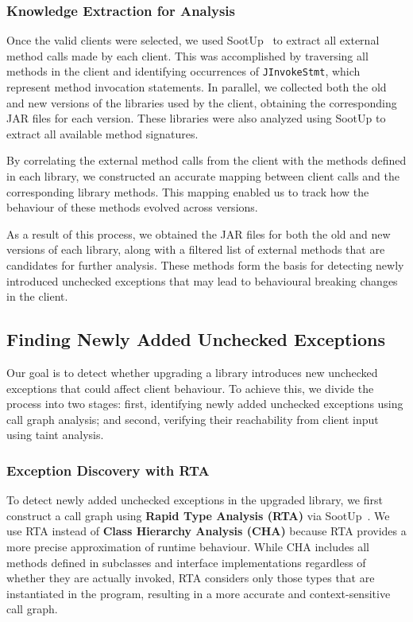 \subsubsection{Knowledge Extraction for Analysis}

Once the valid clients were selected, we used SootUp~\cite{Karakaya24:_sootup} to extract all external method calls made by each client. This was accomplished by traversing all methods in the client and identifying occurrences of \texttt{JInvokeStmt}, which represent method invocation statements. In parallel, we collected both the old and new versions of the libraries used by the client, obtaining the corresponding JAR files for each version. These libraries were also analyzed using SootUp to extract all available method signatures.

By correlating the external method calls from the client with the methods defined in each library, we constructed an accurate mapping between client calls and the corresponding library methods. This mapping enabled us to track how the behaviour of these methods evolved across versions.

As a result of this process, we obtained the JAR files for both the old and new versions of each library, along with a filtered list of external methods that are candidates for further analysis. These methods form the basis for detecting newly introduced unchecked exceptions that may lead to behavioural breaking changes in the client.

\subsection{Finding Newly Added Unchecked Exceptions}

Our goal is to detect whether upgrading a library introduces new unchecked exceptions that could affect client behaviour. To achieve this, we divide the process into two stages: first, identifying newly added unchecked exceptions using call graph analysis; and second, verifying their reachability from client input using taint analysis.

\subsubsection{Exception Discovery with RTA}

To detect newly added unchecked exceptions in the upgraded library, we first construct a call graph using \textbf{Rapid Type Analysis (RTA)} via SootUp~\cite{Karakaya24:_sootup}. We use RTA instead of \textbf{Class Hierarchy Analysis (CHA)} because RTA provides a more precise approximation of runtime behaviour. While CHA includes all methods defined in subclasses and interface implementations regardless of whether they are actually invoked, RTA considers only those types that are instantiated in the program, resulting in a more accurate and context-sensitive call graph.

